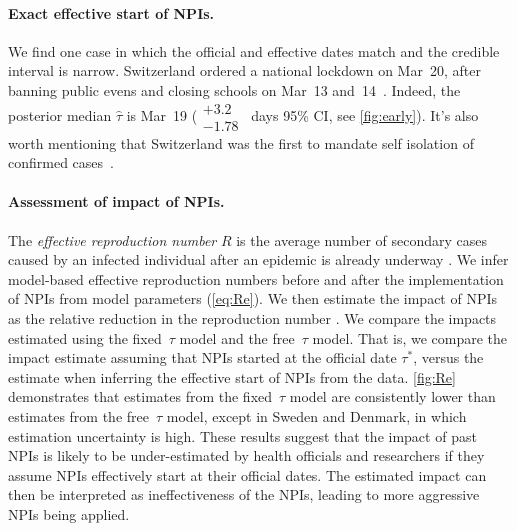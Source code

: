 \documentclass[12pt]{extarticle}
\begin{document}
\paragraph*{Exact effective start of NPIs.}
We find one case in which the official and effective dates match and the credible interval is narrow.
Switzerland ordered a national lockdown on Mar~20, after banning public evens and closing schools on Mar~13 and~14~\citep{Flaxman2020}.
Indeed, the posterior median $\hat{\tau}$ is Mar~19 ($\substack{+3.2 \\ -1.78}$~days 95\% CI, see \autoref{fig:early}). It's also worth mentioning that Switzerland was the first to mandate self isolation of confirmed cases~\citep{Flaxman2020}.



\paragraph*{Assessment of impact of NPIs.}

The \emph{effective reproduction number} $R$ is the average number of secondary
cases caused by an infected individual after an epidemic is already underway \citep{Bar-On2020a}.
We infer model-based effective reproduction numbers before and after the implementation of NPIs from model parameters (\autoref{eq:Re}).
We then estimate the impact of NPIs as the relative reduction in the reproduction number \citep{Flaxman2020}. 
We compare the impacts estimated using the fixed~$\tau$ model and the free~$\tau$ model.
That is, we compare the impact estimate assuming that NPIs started at the official date $\tau^*$, versus the estimate when inferring the effective start of NPIs from the data.
\autoref{fig:Re} demonstrates that estimates from the fixed~$\tau$ model are consistently lower than estimates from the free~$\tau$ model, except in Sweden and Denmark, in which estimation uncertainty is high.   %
These results suggest that the impact of past NPIs is likely to be under-estimated by health officials and researchers if they assume NPIs effectively start at their official dates.
The estimated impact can then be interpreted as ineffectiveness of the NPIs, leading to more aggressive NPIs being applied.
\end{document}
